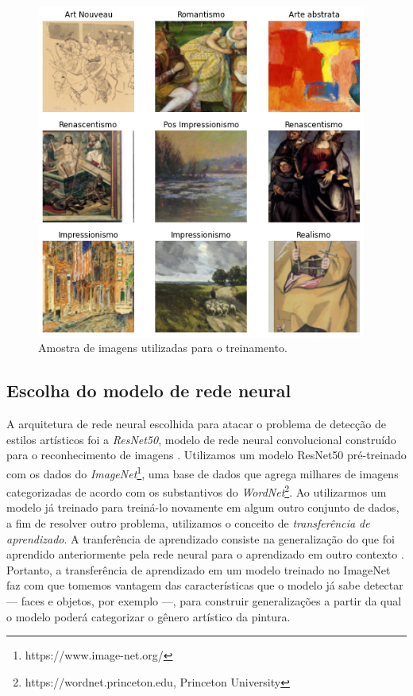 \documentclass[12pt, a4paper]{article}
\begin{document}
\begin{figure}[H]
	\centering
	\includegraphics[width=\textwidth, height=11cm, keepaspectratio=true]{fig/datasample}
	\caption{Amostra de imagens utilizadas para o treinamento.}
\end{figure}

\subsection{Escolha do modelo de rede neural}
A arquitetura de rede neural escolhida para atacar o problema de detecção de estilos artísticos foi a \emph{ResNet50}, modelo de rede neural convolucional construído para o reconhecimento de imagens \cite{he2015deep}. Utilizamos um modelo ResNet50 pré-treinado com os dados do \emph{ImageNet}\footnote{https://www.image-net.org/}, uma base de dados que agrega milhares de imagens categorizadas de acordo com os substantivos do \emph{WordNet}\footnote{https://wordnet.princeton.edu, Princeton University}. Ao utilizarmos um modelo já treinado para treiná-lo novamente em algum outro conjunto de dados, a fim de resolver outro problema, utilizamos o conceito de \emph{transferência de aprendizado}. A tranferência de aprendizado consiste na generalização do que foi aprendido anteriormente pela rede neural para o aprendizado em outro contexto \cite[p.534]{Goodfellow-et-al-2016}. Portanto,
a transferência de aprendizado em um modelo treinado no ImageNet faz com que tomemos vantagem das características que o modelo já sabe detectar --- faces e objetos, por exemplo ---, para construir generalizações a partir da qual o modelo poderá categorizar o gênero artístico da pintura.
\end{document}
